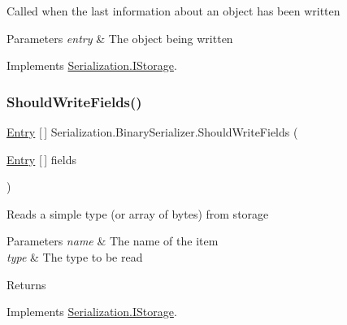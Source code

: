 Called when the last information about an object has been written 


\begin{DoxyParams}{Parameters}
{\em entry} & The object being written\\
\hline
\end{DoxyParams}


Implements \hyperlink{interface_serialization_1_1_i_storage_a03e6828bebedaa8ec17e5f01a7cbd689}{Serialization.\+I\+Storage}.

\mbox{\label{class_serialization_1_1_binary_serializer_a1813abad4bdfe9607f093e4df66a4414}} 
\subsubsection{\texorpdfstring{Should\+Write\+Fields()}{ShouldWriteFields()}}
{\footnotesize\ttfamily \hyperlink{class_serialization_1_1_entry}{Entry} \mbox{[}$\,$\mbox{]} Serialization.\+Binary\+Serializer.\+Should\+Write\+Fields (\begin{DoxyParamCaption}\item[{\hyperlink{class_serialization_1_1_entry}{Entry} \mbox{[}$\,$\mbox{]}}]{fields }\end{DoxyParamCaption})\hspace{0.3cm}{\ttfamily [inline]}}



Reads a simple type (or array of bytes) from storage 


\begin{DoxyParams}{Parameters}
{\em name} & The name of the item\\
\hline
{\em type} & The type to be read\\
\hline
\end{DoxyParams}
\begin{DoxyReturn}{Returns}

\end{DoxyReturn}


Implements \hyperlink{interface_serialization_1_1_i_storage_a0795ec3b6aa77280885c34e2822cb410}{Serialization.\+I\+Storage}.

\mbox{\label{class_serialization_1_1_binary_serializer_a9b376977bd19d9bfef1fce28e110220a}} 
